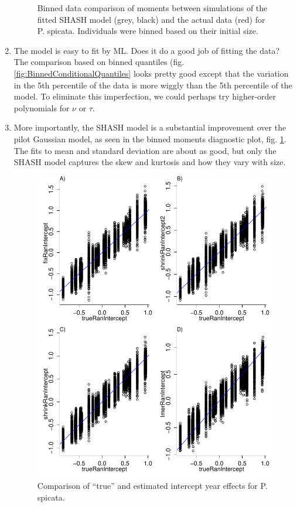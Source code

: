 \documentclass[12pt]{article}
\begin{document}
\begin{enumerate}
\begin{figure}[tbp]
\centering
\caption{Binned data comparison of moments between simulations of the fitted SHASH model (grey, black) and the actual data (red) for 
{P. spicata}. Individuals were binned based on their initial size. }
\label{fig:BinnedConditionalMoments}
\end{figure} 

\item The model is easy to fit by ML. Does it do a good job of fitting the data? The comparison based on binned quantiles 
(fig. \ref{fig:BinnedConditionalQuantiles} looks pretty good except that the variation in the 5th percentile of the data
is more wiggly than the 5th percentile of the model. To eliminate this imperfection, we could perhaps try higher-order polynomials
for $\nu$ or $\tau$. 

\item More importantly, the SHASH model is a substantial improvement over the pilot Gaussian model, as seen in the
binned moments diagnostic plot, fig.  \ref{fig:BinnedConditionalMoments}. The fits to mean and standard deviation are
about as good, but only the SHASH model captures the skew and kurtosis and how they vary with size. 

\begin{figure}[tbp]
\centering
\includegraphics[width=.9\textwidth]{figures/PSSPShrinkageTest.pdf}
\caption{Comparison of ``true'' and estimated intercept year effects for {P. spicata}. }
\label{fig:ShrinkageTest}
\end{figure} 


\end{enumerate}
\end{document}
